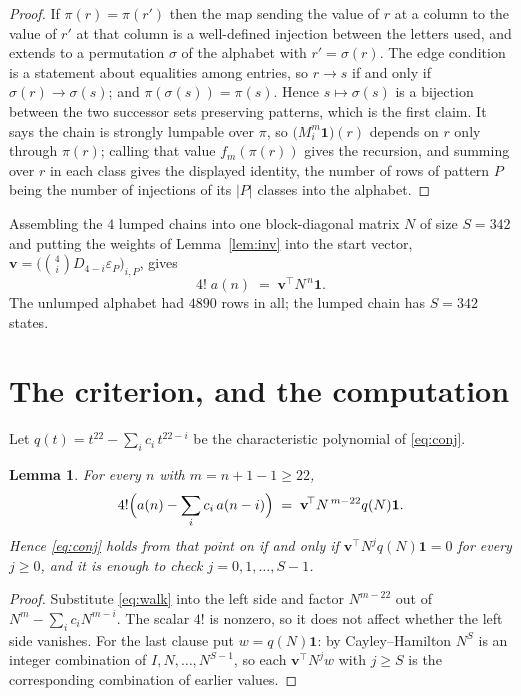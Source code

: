 \documentclass[11pt,a4paper]{article}
\theoremstyle{plain}
\newtheorem{lemma}[theorem]{Lemma}
\theoremstyle{definition}
\begin{document}
\begin{proof}
If $\pi(r)=\pi(r')$ then the map sending the value of $r$ at a column to the value of $r'$
at that column is a well-defined injection between the letters used, and extends to a
permutation $\sigma$ of the alphabet with $r'=\sigma(r)$. The edge condition is a statement
about equalities among entries, so $r\to s$ if and only if $\sigma(r)\to\sigma(s)$; and
$\pi(\sigma(s))=\pi(s)$. Hence $s\mapsto\sigma(s)$ is a bijection between the two successor
sets preserving patterns, which is the first claim. It says the chain is strongly lumpable
over $\pi$, so $\bigl(M_i^{m}\mathbf{1}\bigr)(r)$ depends on $r$ only through $\pi(r)$;
calling that value $f_m(\pi(r))$ gives the recursion, and summing over $r$ in each class
gives the displayed identity, the number of rows of pattern $P$ being the number of
injections of its $|P|$ classes into the alphabet.
\end{proof}

Assembling the $4$ lumped chains into one block-diagonal matrix $N$ of size $S=342$ and
putting the weights of Lemma~\ref{lem:inv} into the start vector,
$\mathbf{v}=\bigl(\binom{4}{i}D_{4-i}\varepsilon_P\bigr)_{i,P}$, gives
\begin{equation}\label{eq:walk}
4!\;a(n)\;=\;\mathbf{v}^{\!\top}N^{\,n}\mathbf{1} .
\end{equation}
The unlumped alphabet had $4890$ rows in all; the lumped chain has $S=342$ states.

\section{The criterion, and the computation}

Let $q(t)=t^{22}-\sum_i c_i\,t^{22-i}$ be the characteristic polynomial of
\eqref{eq:conj}.

\begin{lemma}\label{lem:crit}
For every $n$ with $m=n+1-1\ge22$,
\[
4!\Bigl(a(n)-\sum_i c_i\,a(n-i)\Bigr)\;=\;\mathbf{v}^{\!\top}N^{\,m-22}q(N)\mathbf{1} .
\]
Hence \eqref{eq:conj} holds from that point on if and only if
$\mathbf{v}^{\!\top}N^{j}q(N)\mathbf{1}=0$ for every $j\ge0$, and it is enough to check
$j=0,1,\dots,S-1$.
\end{lemma}

\begin{proof}
Substitute \eqref{eq:walk} into the left side and factor $N^{m-22}$ out of
$N^{m}-\sum_i c_iN^{m-i}$. The scalar $4!$ is nonzero, so it does not affect whether
the left side vanishes. For the last clause put $w=q(N)\mathbf{1}$: by Cayley--Hamilton
$N^{S}$ is an integer combination of $I,N,\dots,N^{S-1}$, so each
$\mathbf{v}^{\!\top}N^{j}w$ with $j\ge S$ is the corresponding combination of earlier
values.
\end{proof}
\end{document}
